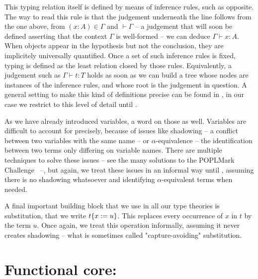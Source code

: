 \begin{marginfigure}
  \begin{mathpar}
  \label{rule:cic-var}
  \end{mathpar}
\end{marginfigure}

This typing relation itself is defined by means of inference rules,
such as  opposite. The way to read this rule is that the judgement
underneath the line follows from the one above,
\ie from $(x : A) \in \Gamma$
and $\vdash \Gamma$ – a judgement that will soon be defined asserting that the context
$\Gamma$ is well-formed – we can deduce $\Gamma \vdash x : A$.
When objects appear in the hypothesis but not the conclusion, they are implicitely
universally quantified.
Once a set of such inference rules is fixed,
typing is defined as the least relation closed by those
rules. Equivalently, a judgement such as $\Gamma \vdash t : T$
holds as soon as we can build a tree whose nodes are instances of the inference rules,
and whose root is the judgement in question. A general setting
to make this kind of definitions precise can be found in ,
in our case we restrict to this level of detail until .

As we have already introduced variables, a word on those as well. Variables are difficult
to account for precisely, because of issues like shadowing – a conflict between two variables
with the same name – or $\alpha$-equivalence – the identification between two terms
only differing on variable names. There are multiple techniques to solve these issues
– see the many solutions to the POPLMark Challenge~ –, 
but again, we treat these issues in an informal way until , assuming
there is no shadowing whatsoever and identifying $\alpha$-equivalent terms when needed.

A final important building block that we use in all our type theories is substitution,
that we write $\subs{t}{x}{u}$. This replaces every occurrence of $x$ in $t$ by the term
$u$. Once again, we treat this operation informally, assuming it never creates
shadowing – what is sometimes called "capture-avoiding" substitution.

\section{Functional core: }
\label{sec:tech-ccw}

